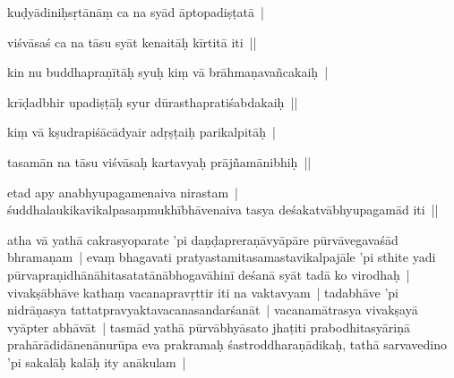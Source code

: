 \documentclass[article,12pt,a4paper]{memoir}%
\newcounter{parCount}
\begin{document}
	  
	  \pstart \leavevmode%
	kuḍyādiniḥsṛtānāṃ ca na syād āptopadiṣṭatā | 
	{}
	\pend%
      

	  
	  \pstart \leavevmode%
	viśvāsaś ca na tāsu syāt kenaitāḥ kīrtitā iti || 
	{}
	\pend%
      

	  
	  \pstart \leavevmode%
	kin nu buddhapraṇītāḥ syuḥ kiṃ vā brāhmaṇavañcakaiḥ | 
	{}
	\pend%
      

	  
	  \pstart \leavevmode%
	krīḍadbhir upadiṣṭāḥ syur dūrasthapratiśabdakaiḥ || 
	{}
	\pend%
      

	  
	  \pstart \leavevmode%
	kiṃ vā kṣudrapiśācādyair adṛṣṭaiḥ parikalpitāḥ | 
	{}
	\pend%
      

	  
	  \pstart \leavevmode%
	tasamān na tāsu viśvāsaḥ kartavyaḥ prājñamānibhiḥ ||
	{}
	\pend%
      

	  
	  \pstart \leavevmode%
	etad apy anabhyupagamenaiva nirastam | śuddhalaukikavikalpasaṃmukhībhāvenaiva tasya deśakatvābhyupagamād iti || 
	{}
	\pend%
      

	  
	  \pstart \leavevmode%
	\label{thakur75-25.11}atha vā yathā cakrasyoparate 'pi daṇḍapreraṇāvyāpāre pūrvāvegavaśād bhramaṇam | evaṃ bhagavati pratyastamitasamastavikalpajāle 'pi sthite yadi pūrvapraṇidhānāhitasatatānābhogavāhinī deśanā syāt tadā ko virodhaḥ | vivakṣābhāve kathaṃ vacanapravṛttir iti na vaktavyam | tadabhāve 'pi nidrāṇasya tattatpravyaktavacanasandarśanāt | vacanamātrasya vivakṣayā vyāpter abhāvāt | tasmād yathā pūrvābhyāsato jhaṭiti prabodhitasyāriṇā prahārādidānenānurūpa eva prakramaḥ śastroddharaṇādikaḥ, tathā sarvavedino 'pi sakalāḥ kalāḥ ity anākulam | 
	{}
	\pend%
      
\end{document}

